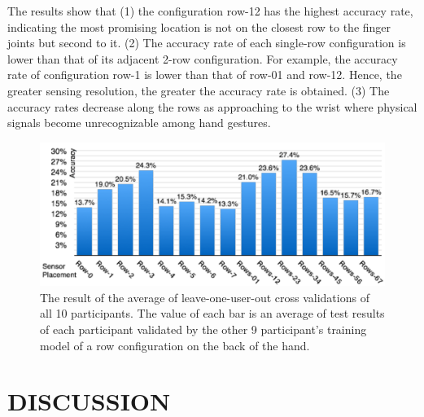 \documentclass{sigchi}
\begin{document}
The results show that
(1) the configuration row-12 has the highest accuracy rate, indicating the most promising location is not on the closest row to the finger joints but second to it. 
(2) The accuracy rate of each single-row configuration is lower than that of its adjacent 2-row configuration. For example, the accuracy rate of configuration row-1 is lower than that of row-01 and row-12. Hence, the greater sensing resolution, the greater the accuracy rate is obtained. 
(3) The accuracy rates decrease along the rows as approaching to the wrist where physical signals become unrecognizable among hand gestures.

\begin{figure}[t]
 \begin{center}
  \includegraphics[width=1\columnwidth]{figures/LOO_V2.pdf}
  \caption{
    The result of the average of leave-one-user-out cross validations of all 10 participants.
    The value of each bar is an average of test results of each participant validated by the other 9 participant's training model of a row configuration on the back of the hand.
  }
  \label{fig:LOO}
  \end{center}
\end{figure}

\section{DISCUSSION}

\end{document}
